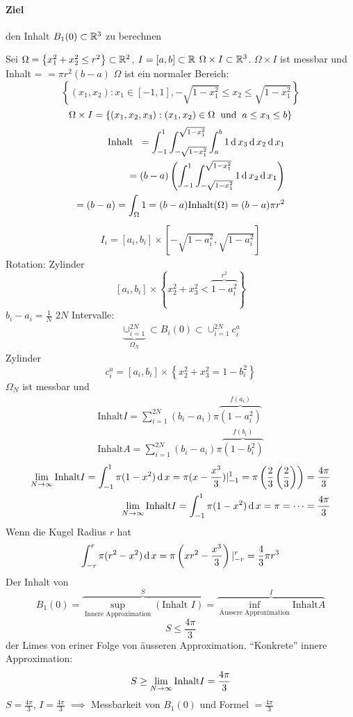 \paragraph{Ziel}
den Inhalt $B_1(0)\subset\mathbb{R}^3$ zu berechnen
\begin{Bew}
  Sei $\Omega=\left\{ x_1^2+x_2^2\leq r^2 \right\}\subset\mathbb{R}^2$, $I=[a,b]\subset\mathbb{R}$ $\Omega\times I\subset\mathbb{R}^3$. $\Omega\times I$ ist messbar und Inhalt = $=\pi r^2(b-a)$ $\Omega$ ist ein normaler Bereich:
  \[\left\{ (x_1,x_2):x_1\in [-1,1], -\sqrt{1-x_1^2}\leq x_2\leq \sqrt{1-x_1^2} \right\}\]
  \[\Omega\times I=\left\{ (x_1,x_2,x_3):(x_1,x_2)\in\Omega\hspace{2mm}\text{und}\hspace{2mm} a\leq x_3\leq b \right\}\]
  \begin{eqnarray*}
    \text{Inhalt}\hspace{2mm} =\int_{-1}^1\int_{-\sqrt{1-x_1^2}}^{\sqrt{1-x_1^2}}\int_a^b 1\operatorname{d} x_3\operatorname{d} x_2\operatorname{d} x_1\\
    =(b-a)\left( \int_{-1}^1\int_{-\sqrt{1-x_1^2}}^{\sqrt{1-x_1^2}}1\operatorname{d} x_2\operatorname{d} x_1 \right)\\
    =(b-a)=\int_\Omega 1=(b-a)\text{Inhalt}(\Omega)=(b-a)\pi r^2
  \end{eqnarray*}
  \begin{eqnarray*}
    I_i=[a_i,b_i]\times [-\sqrt{1-a_i^2},\sqrt{1-a_i^2}]
  \end{eqnarray*}
  Rotation: Zylinder
  \[ [a_i,b_i]\times \left\{ x_2^2+x_3^2<\overbrace{1-a_i^2}^{r^2} \right\}\]
  $b_i-a_i=\frac{1}{N}$ $2N$ Intervalle:
  \begin{eqnarray*}
    \underbrace{\cup_{i=1}^{2N}}_{\Omega_N}\subset B_i(0)\subset\cup_{i=1}^{2N}c_i^a
  \end{eqnarray*}
  Zylinder
  \[c_i^a=[a_i,b_i]\times \left\{ x_2^2+x_3^2=1-b_i^2 \right\}\]
  $\Omega_N$ ist messbar und
  \begin{eqnarray*}
    \text{Inhalt} I = \sum_{i=1}^{2N}(b_i-a_i)\pi\overbrace{(1-a_i^2)}^{f(a_i)}\\
    \text{Inhalt} A = \sum_{i=1}^{2N}(b_i-a_i)\pi\overbrace{(1-b_i^2)}^{f(b_i)}
  \end{eqnarray*}
  \begin{eqnarray*}
    \displaystyle\lim_{N\rightarrow\infty}\text{Inhalt} I=\int_{-1}^1\pi(1-x^2)\operatorname{d} x=\pi(x-\frac{x^3}{3})|_{-1}^1=\pi\left( \frac{2}{3}\left( \frac{2}{3} \right) \right)=\frac{4\pi}{3}\\
    \displaystyle\lim_{N\rightarrow\infty}\text{Inhalt} I=\int_{-1}^1\pi(1-x^2)\operatorname{d} x=\pi = \cdots =\frac{4\pi}{3}\\
  \end{eqnarray*}
  Wenn die Kugel Radius $r$ hat
  \[\int_{-r}^r\pi(r^2-x^2)\operatorname{d} x=\pi\left( xr^2-\frac{x^3}{3} \right)|_{-r}^r=\frac{4}{3}\pi r^3\]
  Der Inhalt von 
  \[B_1(0)=\overbrace{\sup_{\text{Innere Approximation}}(\text{Inhalt $I$})}^S = \overbrace{\inf_{\text{Äussere Approximation}}\text{Inhalt} A}^I\]
  \[S\leq \frac{4\pi}{3}\]
  der Limes von eriner Folge von äusseren Approximation. ``Konkrete'' innere Approximation:
  \[S\geq\displaystyle\lim_{N\rightarrow\infty}\text{Inhalt} I=\frac{4\pi}{3}\]
  $S=\frac{4\pi}{3}$, $I=\frac{4\pi}{3}$ $\implies$ Messbarkeit von $B_1(0)$ und Formel $=\frac{4\pi}{3}$
\end{Bew}
